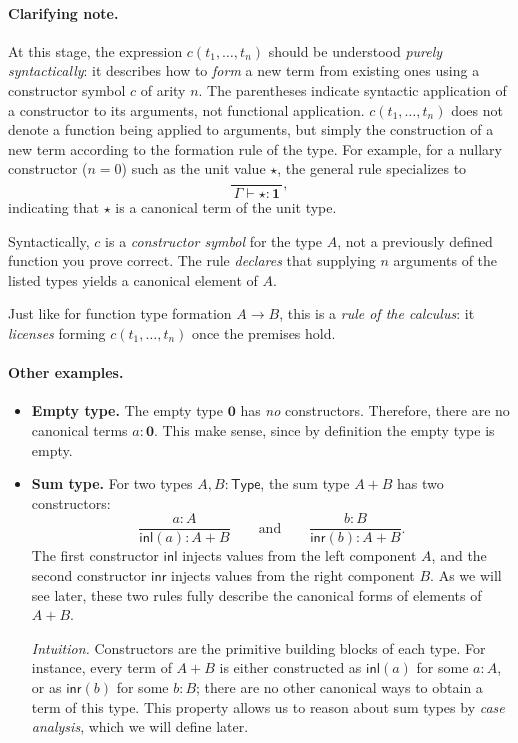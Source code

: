 \documentclass{article}
\newcommand{\Type}{\ensuremath{\mathsf{Type}}}
\newcommand{\inl}{\mathsf{inl}}
\newcommand{\inr}{\mathsf{inr}}
\begin{document}
\paragraph{Clarifying note.}
At this stage, the expression \(c(t_1,\dots,t_n)\) should be understood
\emph{purely syntactically}: it describes how to \emph{form} a new term from
existing ones using a constructor symbol \(c\) of arity \(n\).
The parentheses indicate syntactic application of a constructor to its arguments, not functional application. \(c(t_1,\dots,t_n)\) does not denote a function being applied to arguments, but simply the construction of a new term according to the formation rule of the type. For example, for a nullary constructor (\(n=0\)) such as the unit value \(\star\),
the general rule specializes to
\[
\frac{}{\,\Gamma \vdash \star : \mathbf{1}\,},
\]
indicating that \(\star\) is a canonical term of the unit type.

Syntactically, \(c\) is a \emph{constructor symbol} for the type \(A\), not a previously defined function you prove correct. The rule \emph{declares} that supplying \(n\) arguments of the listed types yields a canonical element of \(A\).

Just like for function type formation \(A \to B\), this is a \emph{rule of the calculus}: it \emph{licenses} forming \(c(t_1,\dots,t_n)\) once the premises hold. 

\paragraph{Other examples.}

\begin{itemize}
  \item \textbf{Empty type.}  
  The empty type \(\mathbf{0}\) has \emph{no} constructors.  
  Therefore, there are no canonical terms \(a : \mathbf{0}\). This make sense, since by definition the empty type is empty.

  \item \textbf{Sum type.}  
  For two types \(A, B : \Type\), the sum type \(A + B\) has two constructors:
  \[
  \frac{a : A}{\inl(a) : A + B}
  \qquad\text{and}\qquad
  \frac{b : B}{\inr(b) : A + B}.
  \]
  The first constructor \(\inl\) injects values from the left component \(A\),
  and the second constructor \(\inr\) injects values from the right component \(B\).
  As we will see later, these two rules fully describe the canonical forms of elements of \(A + B\).
  
  \textit{Intuition.} Constructors are the primitive building blocks of each type. For instance, every term of \(A + B\) is either constructed as \(\inl(a)\) for some \(a : A\), or as \(\inr(b)\) for some \(b : B\); there are no other canonical ways to obtain a term of this type. This property allows us to reason about sum types by \emph{case analysis}, which we will define later.
\end{itemize}
\end{document}
